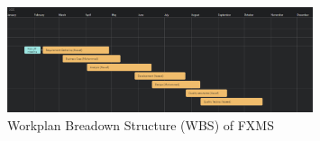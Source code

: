 \documentclass[a4paper]{report}
\begin{document}
\begin{figure}[h!]
    \centering
    \includegraphics[width=0.8\textwidth]{images/wbs.png}
    \caption{Workplan Breadown Structure (WBS) of FXMS}
    \label{fig:wbs}
\end{figure}
\end{document}
